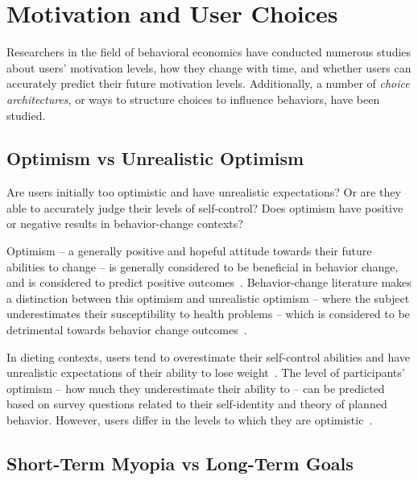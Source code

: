 \section{Motivation and User Choices}


Researchers in the field of behavioral economics have conducted numerous studies about users' motivation levels, how they change with time, and whether users can accurately predict their future motivation levels. Additionally, a number of \textit{choice architectures}, or ways to structure choices to influence behaviors, have been studied.

\subsection{Optimism vs Unrealistic Optimism}
Are users initially too optimistic and have unrealistic expectations? Or are they able to accurately judge their levels of self-control? Does optimism have positive or negative results in behavior-change contexts?

Optimism -- a generally positive and hopeful attitude towards their future abilities to change -- is generally considered to be beneficial in behavior change, and is considered to predict positive outcomes~\cite{davidson1997optimism}. Behavior-change literature makes a distinction between this optimism and unrealistic optimism -- where the subject underestimates their susceptibility to health problems -- which is considered to be detrimental towards behavior change outcomes~\cite{davidson1997optimism}.

In dieting contexts, users tend to overestimate their self-control abilities and have unrealistic expectations of their ability to lose weight~\cite{sparks1995perceived}. The level of participants' optimism -- how much they underestimate their ability to -- can be predicted based on survey questions related to their self-identity and theory of planned behavior. However, users differ in the levels to which they are optimistic~\cite{davidson1997optimism}.


\subsection{Short-Term Myopia vs Long-Term Goals}

